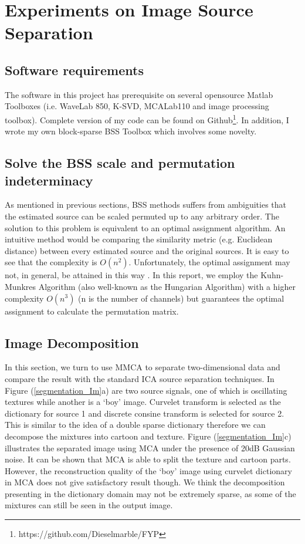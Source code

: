 \section{Experiments on Image Source Separation}
\subsection{Software requirements}
The software in this project has prerequisite on several opensource Matlab Toolboxes (i.e. WaveLab 850, K-SVD, MCALab110 and image processing toolbox). Complete version of my code can be found on Github\footnote{https://github.com/Dieselmarble/FYP}. In addition, I wrote my own block-sparse BSS Toolbox which involves some novelty.

\subsection{Solve the BSS scale and permutation indeterminacy}
As mentioned in previous sections, BSS methods suffers from ambiguities that the estimated source can be scaled permuted up to any arbitrary order. The solution to this problem is equivalent to an optimal assignment algorithm. An intuitive method would be comparing the similarity metric (e.g. Euclidean distance) between every estimated source and the original sources. It is easy to see that the complexity is $O(n^2)$. Unfortunately, the optimal assignment may not, in general, be attained in this way \cite{1261953}. In this report, we employ the Kuhn-Munkres Algorithm (also well-known as the Hungarian Algorithm)
with a higher complexity $O(n^3)$ (n is the number of channels) but guarantees the optimal assignment to calculate the permutation matrix.

\subsection{Image Decomposition}
In this section, we turn to use MMCA to separate two-dimensional data and compare the result with the standard ICA source separation techniques. In Figure (\ref{segmentation_Im}a) are two source signals, one of which is oscillating textures while another is  a `boy' image. Curvelet transform is selected as the dictionary for source 1 and discrete consine transform is selected for source 2. This is similar to the idea of a double sparse dictionary therefore we can decompose the mixtures into cartoon and texture. Figure (\ref{segmentation_Im}c) illustrates the separated image using MCA under the presence of 20dB Gaussian noise. It can be shown that MCA is able to split the texture and cartoon parts. However, the reconstruction quality of the `boy' image using curvelet dictionary in MCA does not give satisfactory result though. We think the decomposition presenting in the dictionary domain may not be extremely sparse, as some of the mixtures can still be seen in the output image. \\

